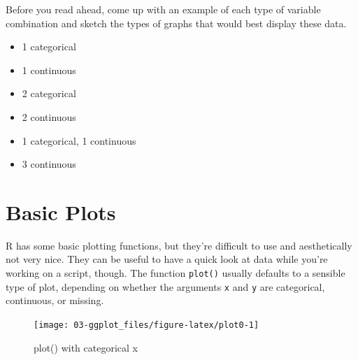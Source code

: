 \documentclass[
  oneside]{book}
\newenvironment{Shaded}{\begin{snugshade}}{\end{snugshade}}
\newcommand{\AttributeTok}[1]{\textcolor[rgb]{0.77,0.63,0.00}{#1}}
\newcommand{\FunctionTok}[1]{\textcolor[rgb]{0.00,0.00,0.00}{#1}}
\newcommand{\NormalTok}[1]{#1}
\newcommand{\SpecialCharTok}[1]{\textcolor[rgb]{0.00,0.00,0.00}{#1}}
\providecommand{\tightlist}{%
  \setlength{\itemsep}{0pt}\setlength{\parskip}{0pt}}
\begin{document}
\begin{try}

Before you read ahead, come up with an example of each type of variable combination and sketch the types of graphs that would best display these data.

\begin{itemize}
\tightlist
\item
  1 categorical
\item
  1 continuous
\item
  2 categorical
\item
  2 continuous
\item
  1 categorical, 1 continuous
\item
  3 continuous
\end{itemize}

\end{try}

\hypertarget{basic-plots}{%
\section{Basic Plots}\label{basic-plots}}

R has some basic plotting functions, but they're difficult to use and aesthetically not very nice. They can be useful to have a quick look at data while you're working on a script, though. The function \texttt{plot()} usually defaults to a sensible type of plot, depending on whether the arguments \texttt{x} and \texttt{y} are categorical, continuous, or missing.

\begin{Shaded}
\end{Shaded}

\begin{figure}

{\centering \texttt{[image: 03-ggplot\_files/figure-latex/plot0-1]} 

}

\caption{plot() with categorical x}\label{fig:plot0}
\end{figure}

\begin{Shaded}
\end{Shaded}
\end{document}
